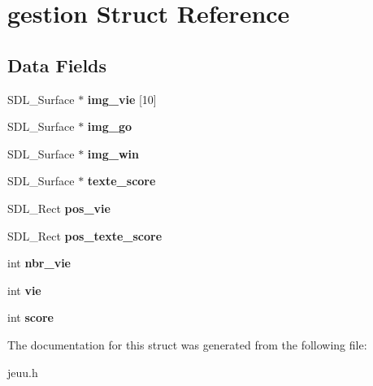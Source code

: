 \hypertarget{structgestion}{}\section{gestion Struct Reference}
\label{structgestion}
\subsection*{Data Fields}
\begin{DoxyCompactItemize}
\item 
S\+D\+L\+\_\+\+Surface $\ast$ {\bfseries img\+\_\+vie} \mbox{[}10\mbox{]}\hypertarget{structgestion_a3212482de55f05a5a8d7d039796e8d51}{}\label{structgestion_a3212482de55f05a5a8d7d039796e8d51}

\item 
S\+D\+L\+\_\+\+Surface $\ast$ {\bfseries img\+\_\+go}\hypertarget{structgestion_a9fdb96d8add7fbf21582e751a1211312}{}\label{structgestion_a9fdb96d8add7fbf21582e751a1211312}

\item 
S\+D\+L\+\_\+\+Surface $\ast$ {\bfseries img\+\_\+win}\hypertarget{structgestion_a2b56a04f8ed6095c16f7764a9c42f541}{}\label{structgestion_a2b56a04f8ed6095c16f7764a9c42f541}

\item 
S\+D\+L\+\_\+\+Surface $\ast$ {\bfseries texte\+\_\+score}\hypertarget{structgestion_a831b479fafa23d89eb406ceeaafd99d6}{}\label{structgestion_a831b479fafa23d89eb406ceeaafd99d6}

\item 
S\+D\+L\+\_\+\+Rect {\bfseries pos\+\_\+vie}\hypertarget{structgestion_abf0e8ba47c2f48b94d09ac71b7e7ccdc}{}\label{structgestion_abf0e8ba47c2f48b94d09ac71b7e7ccdc}

\item 
S\+D\+L\+\_\+\+Rect {\bfseries pos\+\_\+texte\+\_\+score}\hypertarget{structgestion_ab09a75e45fc9a6f8459a44e154f40c5a}{}\label{structgestion_ab09a75e45fc9a6f8459a44e154f40c5a}

\item 
int {\bfseries nbr\+\_\+vie}\hypertarget{structgestion_a5010eb2c372ba77ee65cdcb8c1a8658d}{}\label{structgestion_a5010eb2c372ba77ee65cdcb8c1a8658d}

\item 
int {\bfseries vie}\hypertarget{structgestion_a4dfc8fcfeda49b763355077558415193}{}\label{structgestion_a4dfc8fcfeda49b763355077558415193}

\item 
int {\bfseries score}\hypertarget{structgestion_a103ca6d6de5d63bd9e9ae068bf87e3de}{}\label{structgestion_a103ca6d6de5d63bd9e9ae068bf87e3de}

\end{DoxyCompactItemize}


The documentation for this struct was generated from the following file\+:\begin{DoxyCompactItemize}
\item 
jeuu.\+h\end{DoxyCompactItemize}
